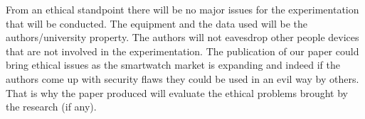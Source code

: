 From an ethical standpoint there will be no major issues for the experimentation that will be conducted. The equipment and the data used will be the authors/university property. The authors will not eavesdrop other people devices that are not involved in the experimentation.
The publication of our paper could bring ethical issues as the smartwatch market is expanding and indeed if the authors come up with security flaws they could be used in an evil way by others. That is why the paper produced will evaluate the ethical problems brought by the research (if any).